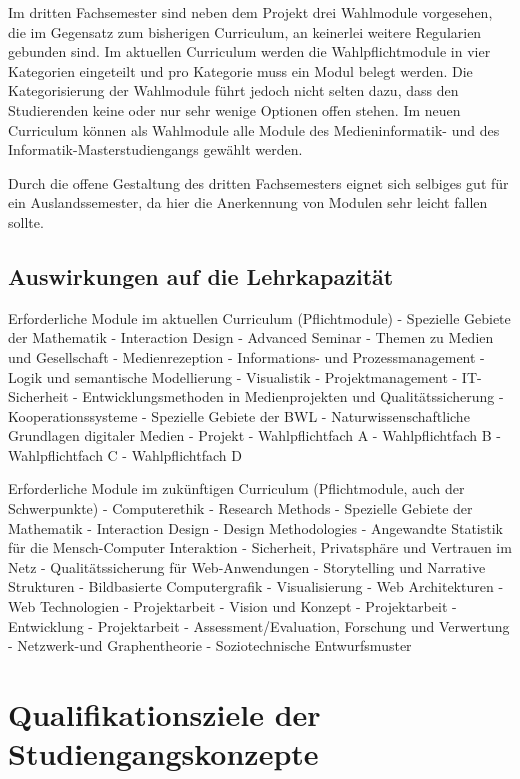 Im dritten Fachsemester sind neben dem Projekt drei Wahlmodule
vorgesehen, die im Gegensatz zum bisherigen Curriculum, an keinerlei
weitere Regularien gebunden sind. Im aktuellen Curriculum werden die
Wahlpflichtmodule in vier Kategorien eingeteilt und pro Kategorie muss
ein Modul belegt werden. Die Kategorisierung der Wahlmodule führt jedoch
nicht selten dazu, dass den Studierenden keine oder nur sehr wenige
Optionen offen stehen. Im neuen Curriculum können als Wahlmodule alle
Module des Medieninformatik- und des Informatik-Masterstudiengangs
gewählt werden.

Durch die offene Gestaltung des dritten Fachsemesters eignet sich
selbiges gut für ein Auslandssemester, da hier die Anerkennung von
Modulen sehr leicht fallen sollte.

\section{Auswirkungen auf die
Lehrkapazität}\label{auswirkungen-auf-die-lehrkapazituxe4t-1}

Erforderliche Module im aktuellen Curriculum (Pflichtmodule) - Spezielle
Gebiete der Mathematik - Interaction Design - Advanced Seminar - Themen
zu Medien und Gesellschaft - Medienrezeption - Informations- und
Prozessmanagement - Logik und semantische Modellierung - Visualistik -
Projektmanagement - IT-Sicherheit - Entwicklungsmethoden in
Medienprojekten und Qualitätssicherung - Kooperationssysteme - Spezielle
Gebiete der BWL - Naturwissenschaftliche Grundlagen digitaler Medien -
Projekt - Wahlpflichtfach A - Wahlpflichtfach B - Wahlpflichtfach C -
Wahlpflichtfach D

Erforderliche Module im zukünftigen Curriculum (Pflichtmodule, auch der
Schwerpunkte) - Computerethik - Research Methods - Spezielle Gebiete der
Mathematik - Interaction Design - Design Methodologies - Angewandte
Statistik für die Mensch-Computer Interaktion - Sicherheit, Privatsphäre
und Vertrauen im Netz - Qualitätssicherung für Web-Anwendungen -
Storytelling und Narrative Strukturen - Bildbasierte Computergrafik -
Visualisierung - Web Architekturen - Web Technologien - Projektarbeit -
Vision und Konzept - Projektarbeit - Entwicklung - Projektarbeit -
Assessment/Evaluation, Forschung und Verwertung - Netzwerk-und
Graphentheorie - Soziotechnische Entwurfsmuster

\chapter{Qualifikationsziele der
Studiengangskonzepte}\label{qualifikationsziele-der-studiengangskonzepte}

